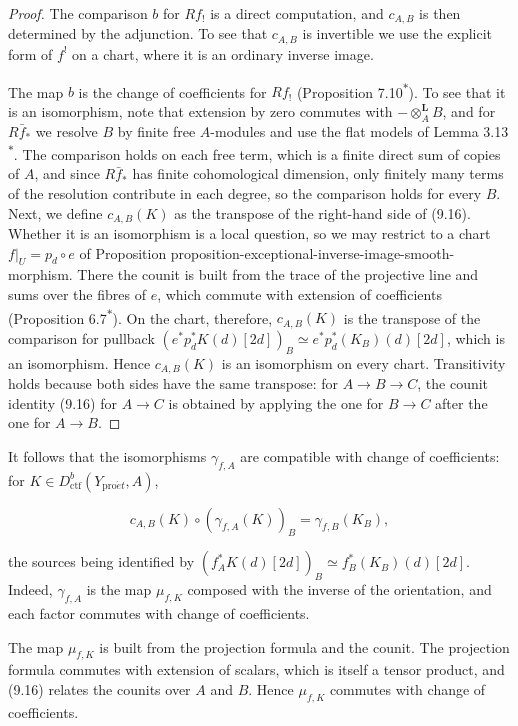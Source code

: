 \documentclass[11pt]{article}
\newcommand{\bpout}[1]{#1\textsuperscript{\hyperlink{bp-outside}{\ensuremath{\ast}}}}
\begin{document}
\begin{proof}[{Proof}]\label{bp50}%
The comparison \(b\) for \(Rf_!\) is a direct computation, and \(c_{A,B}\) is then determined by the adjunction. To see that \(c_{A,B}\) is invertible we use the explicit form of \(f^!\) on a chart, where it is an ordinary inverse image.

The map \(b\) is the change of coefficients for \(Rf_!\) (Proposition \bpout{7.10}). To see that it is an isomorphism, note that extension by zero commutes with \(-\otimes^{\mathbf L}_AB\), and for \(R\bar f_*\) we resolve \(B\) by finite free \(A\)-modules and use the flat models of Lemma \bpout{3.13}. The comparison holds on each free term, which is a finite direct sum of copies of \(A\), and since \(R\bar f_*\) has finite cohomological dimension, only finitely many terms of the resolution contribute in each degree, so the comparison holds for every \(B\). Next, we define \(c_{A,B}(K)\) as the transpose of the right-hand side of (9.16). Whether it is an isomorphism is a local question, so we may restrict to a chart \(f|_U=p_d\circ e\) of Proposition proposition-exceptional-inverse-image-smooth-morphism. There the counit is built from the trace of the projective line and sums over the fibres of \(e\), which commute with extension of coefficients (Proposition \bpout{6.7}). On the chart, therefore, \(c_{A,B}(K)\) is the transpose of the comparison for pullback \((e^*p_d^*K(d)[2d])_B\simeq e^*p_d^*(K_B)(d)[2d]\), which is an isomorphism. Hence \(c_{A,B}(K)\) is an isomorphism on every chart. Transitivity holds because both sides have the same transpose: for \(A\to B\to C\), the counit identity (9.16) for \(A\to C\) is obtained by applying the one for \(B\to C\) after the one for \(A\to B\).
\end{proof}

\label{bp51}%
It follows that the isomorphisms \(\gamma_{f,A}\) are compatible with change of coefficients: for \(K\in D^b_{\mathrm{ctf}}(Y_{\mathrm{pro}\acute{e}t},A)\),

\[
c_{A,B}(K)\circ(\gamma_{f,A}(K))_B=\gamma_{f,B}(K_B),
\tag{9.17}
\]

the sources being identified by \((f_A^*K(d)[2d])_B\simeq f_B^*(K_B)(d)[2d]\). Indeed, \(\gamma_{f,A}\) is the map \(\mu_{f,K}\) composed with the inverse of the orientation, and each factor commutes with change of coefficients.

The map \(\mu_{f,K}\) is built from the projection formula and the counit. The projection formula commutes with extension of scalars, which is itself a tensor product, and (9.16) relates the counits over \(A\) and \(B\). Hence \(\mu_{f,K}\) commutes with change of coefficients.
\end{document}
